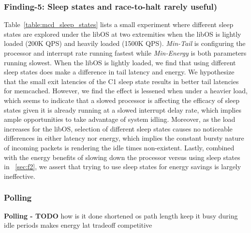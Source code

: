 \subsubsection{Finding-5: Sleep states and race-to-halt rarely useful)} \label{sec:f5} 
Table~\ref{table:mcd_sleep_states} lists a small experiment where different sleep states are explored under the libOS at two extremities when the libOS is lightly loaded (200K QPS) and heavily loaded (1500K QPS). \textit{Min-Tail} is configuring the processor and interrupt rate running fastest while \textit{Min-Energy} is both parameters running slowest. When the libOS is lightly loaded, we find that using different sleep states does make a difference in tail latency and energy. We hypothesize that the small exit latencies of the C1 sleep state results in better tail latencies for memcached. However, we find the effect is lessened when under a heavier load, which seems to indicate that a slowed processor is affecting the efficacy of sleep states given it is already running at a slowed interrupt delay rate, which implies ample opportunities to take advantage of system idling. Moreover, as the load increases for the libOS, selection of different sleep states causes no noticeable differences in either latency nor energy, which implies the constant bursty nature of incoming packets is rendering the idle times non-existent. Lastly, combined with the energy benefits of slowing down the processor versus using sleep states in ~\ref{sec:f2}, we assert that trying to use sleep states for energy savings is largely ineffective. 

\subsubsection{Polling}
\textbf{Polling - TODO}
how is it done
shortened os path length keep it busy during idle periods makes energy lat tradeoff competitive
